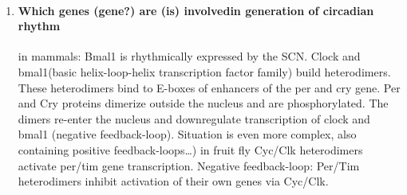 \documentclass[12pt,article,oneside,a4paper]{memoir}
\begin{document}
\begin{enumerate}
\item \paragraph{Which genes (gene?) are (is) involvedin generation of circadian rhythm}

in mammals: Bmal1 is rhythmically expressed by the SCN. Clock and bmal1(basic helix-loop-helix transcription factor family) build heterodimers. These heterodimers bind to E-boxes of enhancers of the per and cry gene. Per and Cry proteins dimerize outside the nucleus and are phosphorylated. The dimers re-enter the nucleus and downregulate transcription of  clock and bmal1 (negative feedback-loop). Situation is even more complex, also containing positive feedback-loops…)
        in fruit fly Cyc/Clk heterodimers activate per/tim gene transcription. Negative feedback-loop: Per/Tim heterodimers inhibit activation of their own genes via Cyc/Clk.
\end{enumerate}
\end{document}
